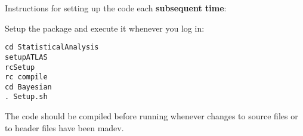 \documentclass[UKenglish]{latex/atlasdoc}
\begin{document}
\begin{description}

\item Instructions for setting up the code each \textbf{subsequent time}: 

\item[Step 1] Setup the package and execute it whenever you log in:
\begin{lstlisting}[breaklines]
cd StatisticalAnalysis
setupATLAS
rcSetup
rc compile
cd Bayesian
. Setup.sh
\end{lstlisting}
The code should be compiled before running whenever changes to source files or to header files have been madev.
\end{description}

\end{document}
